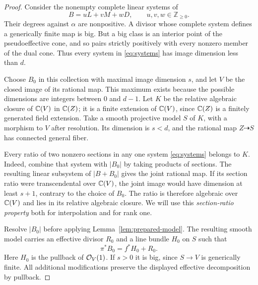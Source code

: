 \begin{proof}
Consider the nonempty complete linear systems of
\begin{equation}\label{eq:systems}
              B=uL+vM+wD,
       \qquad u,v,w\in\mathbb Z_{\ge0}.
\end{equation}
Their degrees against $\alpha$ are nonpositive. A divisor whose
complete system defines a generically finite map is big. But a big
class is an interior point of the pseudoeffective cone, and so pairs
strictly positively with every nonzero member of the dual cone.
Thus every system in \eqref{eq:systems} has image dimension less than
$d$.

Choose $B_0$ in this collection with maximal image dimension $s$, and
let $V$ be the closed image of its rational map. This maximum exists
because the possible dimensions are integers between $0$ and $d-1$.
Let $K$ be the relative algebraic closure of $\mathbb C(V)$ in $\mathbb C(Z)$;
it is a finite extension of $\mathbb C(V)$, since $\mathbb C(Z)$ is a finitely
generated field extension. Take a smooth projective model $S$ of $K$,
with a morphism to $V$ after resolution. Its dimension is $s<d$, and
the rational map $Z\dashrightarrow S$ has connected general fiber.

Every ratio of two nonzero sections in any one system
\eqref{eq:systems} belongs to $K$. Indeed, combine that system with
$|B_0|$ by taking products of sections. The resulting linear subsystem
of $|B+B_0|$ gives the joint rational map. If its section ratio were
transcendental over $\mathbb C(V)$, the joint image would have dimension
at least $s+1$, contrary to the choice of $B_0$. The ratio is therefore
algebraic over $\mathbb C(V)$ and lies in its relative algebraic closure.
We will use this \emph{section-ratio property} both for interpolation
and for rank one.

Resolve $|B_0|$ before applying Lemma~\ref{lem:prepared-model}.
The resulting smooth model carries an effective divisor $R_0$ and a
line bundle $H_0$ on $S$ such that
\begin{equation}\label{eq:fixed-moving}
                  \pi^*B_0=f^*H_0+R_0.
\end{equation}
Here $H_0$ is the pullback of $\mathcal O_V(1)$. If $s>0$ it is big,
since $S\to V$ is generically finite. All additional modifications
preserve the displayed effective decomposition by pullback.


\end{proof}
